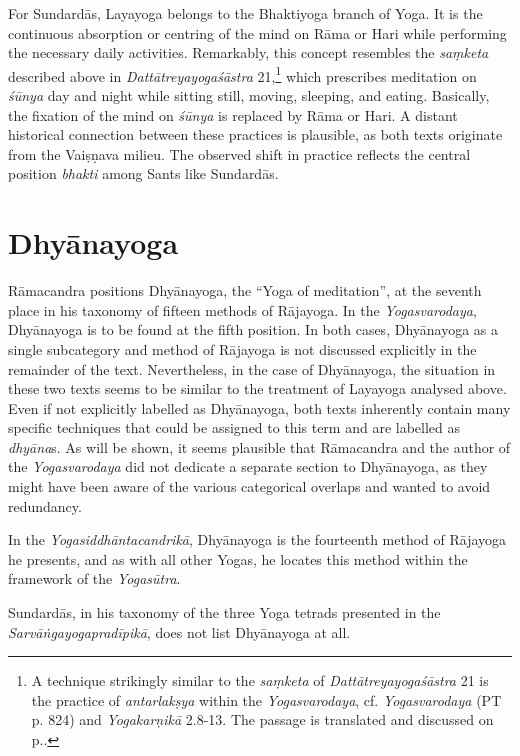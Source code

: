 For Sundardās, Layayoga belongs to the Bhaktiyoga branch of Yoga. It is the continuous absorption or centring of the mind on Rāma or Hari while performing the necessary daily activities. Remarkably, this concept resembles the \textit{saṃketa} described above in \emph{Dattātreyayogaśāstra} 21,\footnote{A technique strikingly similar to the \textit{saṃketa} of \emph{Dattātreyayogaśāstra} 21 is the practice of \textit{antarlakṣya} within the \textit{Yogasvarodaya}, cf. \textit{Yogasvarodaya} (PT p. 824) and \textit{Yogakarṇikā} 2.8-13. The passage is translated and discussed on p.\pageref{antarsvayotrans}.} which prescribes meditation on \textit{śūnya} day and night while sitting still, moving, sleeping, and eating. Basically, the fixation of the mind on \textit{śūnya} is replaced by Rāma or Hari. A distant historical connection between these practices is plausible, as both texts originate from the Vaiṣṇava milieu. The observed shift in practice reflects the central position \textit{bhakti} among Sants like Sundardās.

\section{Dhyānayoga}
\label{dhyānayogaintro}

Rāmacandra positions Dhyānayoga, the ``Yoga of meditation'', at the seventh place in his taxonomy of fifteen methods of Rājayoga. In the \textit{Yogasvarodaya}, Dhyānayoga is to be found at the fifth position. In both cases, Dhyānayoga as a single subcategory and method of Rājayoga is not discussed explicitly in the remainder of the text. Nevertheless, in the case of Dhyānayoga, the situation in these two texts seems to be similar to the treatment of Layayoga analysed above. Even if not explicitly labelled as Dhyānayoga, both texts inherently contain many specific techniques that could be assigned to this term and are labelled as \textit{dhyāna}s. As will be shown, it seems plausible that Rāmacandra and the author of the \emph{Yogasvarodaya} did not dedicate a separate section to Dhyānayoga, as they might have been aware of the various categorical overlaps and wanted to avoid redundancy.

In the \textit{Yogasiddhāntacandrikā}, Dhyānayoga is the fourteenth method of Rājayoga he presents, and as with all other Yogas, he locates this method within the framework of the \emph{Yogasūtra}.

Sundardās, in his taxonomy of the three Yoga tetrads presented in the \textit{Sarvāṅgayogapradīpikā}, does not list Dhyānayoga at all.

